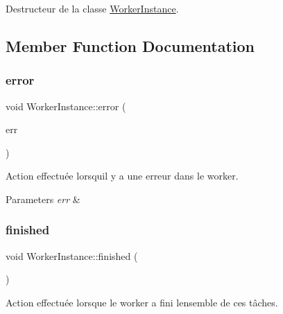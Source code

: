 Destructeur de la classe \hyperlink{classWorkerInstance}{Worker\+Instance}. 



\subsection{Member Function Documentation}
\mbox{\label{classWorkerInstance_a7327b868e3d96daa63e71c47076e598e}} 
\subsubsection{\texorpdfstring{error}{error}}
{\footnotesize\ttfamily void Worker\+Instance\+::error (\begin{DoxyParamCaption}\item[{Q\+String}]{err }\end{DoxyParamCaption})\hspace{0.3cm}{\ttfamily [signal]}}



Action effectuée lorsqu\textquotesingle{}il y a une erreur dans le worker. 


\begin{DoxyParams}{Parameters}
{\em err} & \\
\hline
\end{DoxyParams}
\mbox{\label{classWorkerInstance_ac9e45034de2450472fcc07ba0b960000}} 
\subsubsection{\texorpdfstring{finished}{finished}}
{\footnotesize\ttfamily void Worker\+Instance\+::finished (\begin{DoxyParamCaption}{ }\end{DoxyParamCaption})\hspace{0.3cm}{\ttfamily [signal]}}



Action effectuée lorsque le worker a fini l\textquotesingle{}ensemble de ces tâches. 

\mbox{\label{classWorkerInstance_ab9005529d8aa529d74226d8e4a1e9f3f}} 
